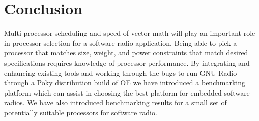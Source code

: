 \documentclass[english]{article}
\begin{document}
\section{Conclusion}
Multi-processor scheduling and speed of vector math will play an important role in processor selection for a software radio application. 
Being able to pick a processor that matches size, weight, and power constraints that match desired specifications requires knowledge of processor performance. 
By integrating and enhancing existing tools and working through the bugs to run GNU Radio through a Poky distribution build of OE we have introduced a benchmarking platform which can assist in choosing the best platform for embedded software radios.
We have also introduced benchmarking results for a small set of potentially suitable processors for software radio.

{}


% 
\lstset{numbers=left, basicstyle=\footnotesize\ttfamily, numberstyle=\tiny, stepnumber=4, numbersep=5pt,
title=\lstname, tabsize=5
}






\end{document}
